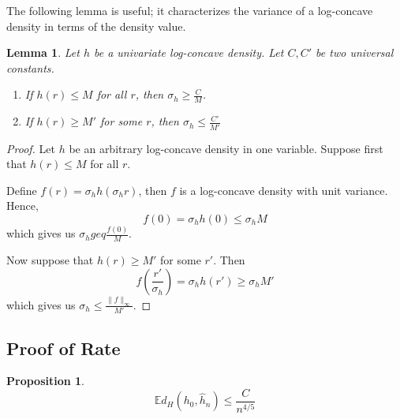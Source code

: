 \documentclass[12pt]{article}
\newtheorem{lemma}[theorem]{Lemma}
\newtheorem{proposition}[theorem]{Proposition}
\begin{document}
  The following lemma is useful; it characterizes the variance of a log-concave density in terms of the density value. 

  \begin{lemma}
    \label{Lem:VarianceSupRelation}
    Let $h$ be a univariate log-concave density. Let $C, C'$ be two universal constants.
    \begin{enumerate}
    \item If $h(r) \leq M$ for all $r$, then $\sigma_h \geq \frac{C}{M}$.
    \item If $h(r) \geq M'$ for some $r$, then $\sigma_h \leq \frac{C'}{M'}$
    \end{enumerate}
  \end{lemma}

  \begin{proof}
    Let $h$ be an arbitrary log-concave density in one variable. Suppose first that $h(r) \leq M$ for all $r$.

    Define $f(r) = \sigma_h h( \sigma_h r)$, then $f$ is a log-concave density with unit variance. Hence,
    \[
      f(0) = \sigma_h h(0) \leq \sigma_h M
    \]
    which gives us $\sigma_h geq \frac{f(0)}{M}$.

    Now suppose that $h(r) \geq M'$ for some $r'$. Then
    \[
      f(\frac{r'}{\sigma_h}) = \sigma_h h(r') \geq \sigma_h M'
    \]
    which gives us $\sigma_h \leq \frac{ \|f \|_\infty}{M'}$.
  \end{proof}
    


\subsection{Proof of Rate}


\begin{proposition}

  \[
    \mathbb{E} d_H(h_0, \hat{h}_n) \leq \frac{C}{n^{4/5}}
  \]
  
\end{proposition}
\end{document}
